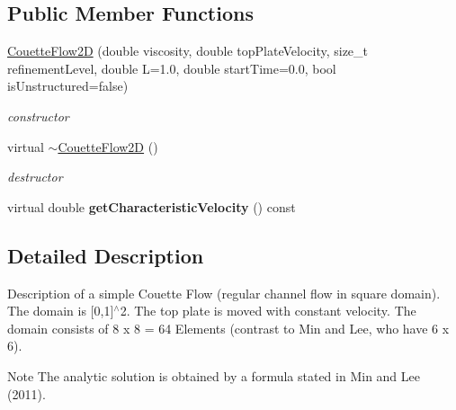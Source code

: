 \subsection*{Public Member Functions}
\begin{DoxyCompactItemize}
\item 
\hyperlink{classnatrium_1_1CouetteFlow2D_a94e51b7eaff3998383f1d7dc07b994cb}{CouetteFlow2D} (double viscosity, double topPlateVelocity, size\_\-t refinementLevel, double L=1.0, double startTime=0.0, bool isUnstructured=false)
\begin{DoxyCompactList}\small\item\em constructor \item\end{DoxyCompactList}\item 
\hypertarget{classnatrium_1_1CouetteFlow2D_a97b61b0f71dc653427ba3db46e185873}{
virtual \hyperlink{classnatrium_1_1CouetteFlow2D_a97b61b0f71dc653427ba3db46e185873}{$\sim$CouetteFlow2D} ()}
\label{classnatrium_1_1CouetteFlow2D_a97b61b0f71dc653427ba3db46e185873}

\begin{DoxyCompactList}\small\item\em destructor \item\end{DoxyCompactList}\item 
\hypertarget{classnatrium_1_1CouetteFlow2D_a74429d98c455a0c06430a665505d8375}{
virtual double {\bfseries getCharacteristicVelocity} () const }
\label{classnatrium_1_1CouetteFlow2D_a74429d98c455a0c06430a665505d8375}

\end{DoxyCompactItemize}


\subsection{Detailed Description}
Description of a simple Couette Flow (regular channel flow in square domain). The domain is \mbox{[}0,1\mbox{]}$^\wedge$2. The top plate is moved with constant velocity. The domain consists of 8 x 8 = 64 Elements (contrast to Min and Lee, who have 6 x 6). \begin{DoxyNote}{Note}
The analytic solution is obtained by a formula stated in Min and Lee (2011). 
\end{DoxyNote}



